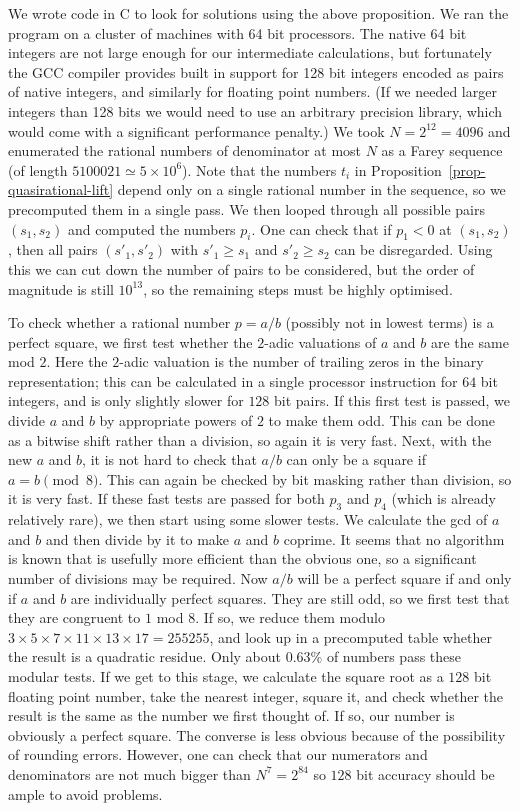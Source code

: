 \documentclass[reqno]{amsart}
\newcommand{\tm}        {\times}
\renewcommand{\:}{\colon}
\theoremstyle{definition}
\begin{document}
We wrote code in C to look for solutions using the above proposition.
We ran the program on a cluster of machines with 64 bit processors.
The native 64 bit integers are not large enough for our intermediate
calculations, but fortunately the GCC compiler provides built in
support for 128 bit integers encoded as pairs of native integers, and
similarly for floating point numbers.  (If we needed larger integers
than 128 bits we would need to use an arbitrary precision library,
which would come with a significant performance penalty.)  We took
$N=2^{12}=4096$ and enumerated the rational numbers of denominator at
most $N$ as a Farey sequence (of length $5100021\simeq 5\tm 10^6$).
Note that the numbers $t_i$ in
Proposition~\ref{prop-quasirational-lift} depend only on a single
rational number in the sequence, so we precomputed them in a single
pass.  We then looped through all possible pairs $(s_1,s_2)$ and
computed the numbers $p_i$.  One can check that if $p_1<0$ at
$(s_1,s_2)$, then all pairs $(s'_1,s'_2)$ with $s'_1\geq s_1$ and
$s'_2\geq s_2$ can be disregarded.  Using this we can cut down the
number of pairs to be considered, but the order of magnitude is still
$10^{13}$, so the remaining steps must be highly optimised.

To check whether a rational number $p=a/b$ (possibly not in lowest
terms) is a perfect square, we first test whether the $2$-adic
valuations of $a$ and $b$ are the same mod $2$.  Here the $2$-adic
valuation is the number of trailing zeros in the binary
representation; this can be calculated in a single processor
instruction for $64$ bit integers, and is only slightly slower for
$128$ bit pairs.  If this first test is passed, we divide $a$ and $b$
by appropriate powers of $2$ to make them odd.  This can be done as a
bitwise shift rather than a division, so again it is very fast.  Next,
with the new $a$ and $b$, it is not hard to check that $a/b$ can only
be a square if $a=b\pmod{8}$.  This can again be checked by bit
masking rather than division, so it is very fast.  If these fast tests
are passed for both $p_3$ and $p_4$ (which is already relatively
rare), we then start using some slower tests.  We calculate the gcd of
$a$ and $b$ and then divide by it to make $a$ and $b$ coprime.  It
seems that no algorithm is known that is usefully more efficient
than the obvious one, so a significant number of divisions may be
required.  Now $a/b$ will be a perfect square if and only if $a$ and
$b$ are individually perfect squares.  They are still odd, so we first
test that they are congruent to $1$ mod $8$.  If so, we reduce them
modulo $3\tm 5\tm 7\tm 11\tm 13\tm 17=255255$, and look up in a
precomputed table whether the result is a quadratic residue.  Only
about $0.63\%$ of numbers pass these modular tests.  If we get to this
stage, we calculate the square root as a $128$ bit floating point
number, take the nearest integer, square it, and check whether the
result is the same as the number we first thought of.  If so, our
number is obviously a perfect square.  The converse is less obvious
because of the possibility of rounding errors.  However, one can check
that our numerators and denominators are not much bigger than
$N^7=2^{84}$ so $128$ bit accuracy should be ample to avoid problems.
\end{document}
